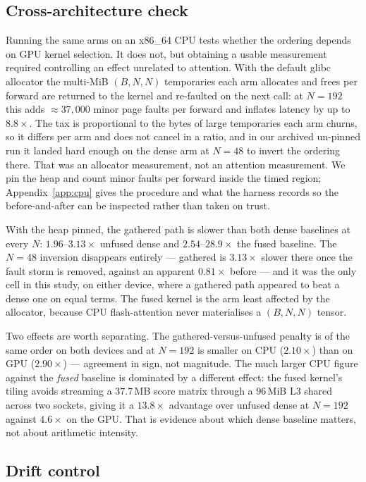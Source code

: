\subsection{Cross-architecture check}
\label{sec:cpu}

Running the same arms on an x86\_64 CPU tests whether the ordering depends on
GPU kernel selection. It does not, but obtaining a usable measurement required
controlling an effect unrelated to attention. With the default glibc allocator
the multi-MiB $(B,N,N)$ temporaries each arm allocates and frees per forward
are returned to the kernel and re-faulted on the next call: at $N{=}192$ this
adds $\approx37{,}000$ minor page faults per forward and inflates latency by up
to $8.8\times$. The tax is proportional to the bytes of large temporaries each
arm churns, so it differs per arm and does not cancel in a ratio, and in our
archived un-pinned run it landed hard enough on the dense arm at $N{=}48$ to
invert the ordering there. That was an allocator measurement, not an attention
measurement. We pin the heap and count minor faults per forward inside the
timed region; Appendix~\ref{app:cpu} gives the procedure and what the harness
records so the before-and-after can be inspected rather than taken on trust.

With the heap pinned, the gathered path is slower than both dense baselines at
every $N$: $1.96$--$3.13\times$ unfused dense and $2.54$--$28.9\times$ the
fused baseline. The $N{=}48$ inversion disappears entirely --- gathered is
$3.13\times$ slower there once the fault storm is removed, against an apparent
$0.81\times$ before --- and it was the only cell in this study, on either
device, where a gathered path appeared to beat a dense one on equal terms. The
fused kernel is the arm least affected by the allocator, because CPU
flash-attention never materialises a $(B,N,N)$ tensor.

Two effects are worth separating. The gathered-versus-unfused penalty is of the
same order on both devices and at $N{=}192$ is smaller on CPU ($2.10\times$)
than on GPU ($2.90\times$) --- agreement in sign, not magnitude. The much larger
CPU figure against the \emph{fused} baseline is dominated by a different
effect: the fused kernel's tiling avoids streaming a $37.7$\,MB score matrix
through a $96$\,MiB L3 shared across two sockets, giving it a $13.8\times$
advantage over unfused dense at $N{=}192$ against $4.6\times$ on the GPU. That
is evidence about which dense baseline matters, not about arithmetic
intensity.

\subsection{Drift control}
\label{sec:drift}

